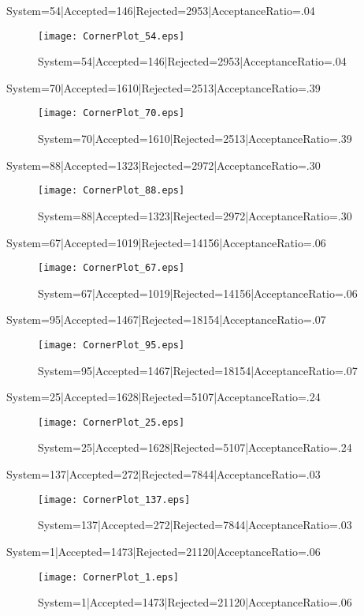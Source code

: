 \documentclass[10pt]{article}
\begin{document}
System=54|Accepted=146|Rejected=2953|AcceptanceRatio=.04
\begin{figure}[h]
\texttt{[image: CornerPlot\_54.eps]}
\caption{System=54|Accepted=146|Rejected=2953|AcceptanceRatio=.04}
\label{S54}
\centering
\end{figure}

System=70|Accepted=1610|Rejected=2513|AcceptanceRatio=.39
\begin{figure}[h]
\texttt{[image: CornerPlot\_70.eps]}
\caption{System=70|Accepted=1610|Rejected=2513|AcceptanceRatio=.39}
\label{S70}
\centering
\end{figure}

System=88|Accepted=1323|Rejected=2972|AcceptanceRatio=.30
\begin{figure}[h]
\texttt{[image: CornerPlot\_88.eps]}
\caption{System=88|Accepted=1323|Rejected=2972|AcceptanceRatio=.30}
\label{S88}
\centering
\end{figure}

System=67|Accepted=1019|Rejected=14156|AcceptanceRatio=.06
\begin{figure}[h]
\texttt{[image: CornerPlot\_67.eps]}
\caption{System=67|Accepted=1019|Rejected=14156|AcceptanceRatio=.06}
\label{S67}
\centering
\end{figure}

System=95|Accepted=1467|Rejected=18154|AcceptanceRatio=.07
\begin{figure}[h]
\texttt{[image: CornerPlot\_95.eps]}
\caption{System=95|Accepted=1467|Rejected=18154|AcceptanceRatio=.07}
\label{S95}
\centering
\end{figure}

System=25|Accepted=1628|Rejected=5107|AcceptanceRatio=.24
\begin{figure}[h]
\texttt{[image: CornerPlot\_25.eps]}
\caption{System=25|Accepted=1628|Rejected=5107|AcceptanceRatio=.24}
\label{S25}
\centering
\end{figure}

System=137|Accepted=272|Rejected=7844|AcceptanceRatio=.03
\begin{figure}[h]
\texttt{[image: CornerPlot\_137.eps]}
\caption{System=137|Accepted=272|Rejected=7844|AcceptanceRatio=.03}
\label{S137}
\centering
\end{figure}

System=1|Accepted=1473|Rejected=21120|AcceptanceRatio=.06
\begin{figure}[h]
\texttt{[image: CornerPlot\_1.eps]}
\caption{System=1|Accepted=1473|Rejected=21120|AcceptanceRatio=.06}
\label{S1}
\centering
\end{figure}
\end{document}
